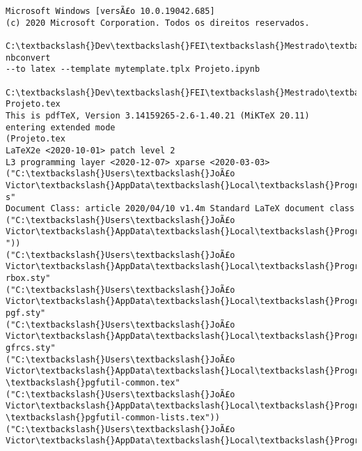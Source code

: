 \documentclass[11pt]{article}
\begin{document}
    \begin{Verbatim}[commandchars=\\\{\}]
Microsoft Windows [versÃ£o 10.0.19042.685]
(c) 2020 Microsoft Corporation. Todos os direitos reservados.

C:\textbackslash{}Dev\textbackslash{}FEI\textbackslash{}Mestrado\textbackslash{}3\_Periodo\textbackslash{}PEL301\_Biopotenciais\textbackslash{}Projeto>ipython nbconvert
--to latex --template mytemplate.tplx Projeto.ipynb

C:\textbackslash{}Dev\textbackslash{}FEI\textbackslash{}Mestrado\textbackslash{}3\_Periodo\textbackslash{}PEL301\_Biopotenciais\textbackslash{}Projeto>pdflatex Projeto.tex
This is pdfTeX, Version 3.14159265-2.6-1.40.21 (MiKTeX 20.11)
entering extended mode
(Projeto.tex
LaTeX2e <2020-10-01> patch level 2
L3 programming layer <2020-12-07> xparse <2020-03-03>
("C:\textbackslash{}Users\textbackslash{}JoÃ£o Victor\textbackslash{}AppData\textbackslash{}Local\textbackslash{}Programs\textbackslash{}MiKTeX\textbackslash{}tex/latex/base\textbackslash{}article.cl
s"
Document Class: article 2020/04/10 v1.4m Standard LaTeX document class
("C:\textbackslash{}Users\textbackslash{}JoÃ£o Victor\textbackslash{}AppData\textbackslash{}Local\textbackslash{}Programs\textbackslash{}MiKTeX\textbackslash{}tex/latex/base\textbackslash{}size11.clo
"))
("C:\textbackslash{}Users\textbackslash{}JoÃ£o Victor\textbackslash{}AppData\textbackslash{}Local\textbackslash{}Programs\textbackslash{}MiKTeX\textbackslash{}tex/latex/tcolorbox\textbackslash{}tcolo
rbox.sty"
("C:\textbackslash{}Users\textbackslash{}JoÃ£o Victor\textbackslash{}AppData\textbackslash{}Local\textbackslash{}Programs\textbackslash{}MiKTeX\textbackslash{}tex/latex/pgf/basiclayer\textbackslash{}
pgf.sty"
("C:\textbackslash{}Users\textbackslash{}JoÃ£o Victor\textbackslash{}AppData\textbackslash{}Local\textbackslash{}Programs\textbackslash{}MiKTeX\textbackslash{}tex/latex/pgf/utilities\textbackslash{}p
gfrcs.sty"
("C:\textbackslash{}Users\textbackslash{}JoÃ£o Victor\textbackslash{}AppData\textbackslash{}Local\textbackslash{}Programs\textbackslash{}MiKTeX\textbackslash{}tex/generic/pgf/utilities
\textbackslash{}pgfutil-common.tex"
("C:\textbackslash{}Users\textbackslash{}JoÃ£o Victor\textbackslash{}AppData\textbackslash{}Local\textbackslash{}Programs\textbackslash{}MiKTeX\textbackslash{}tex/generic/pgf/utilities
\textbackslash{}pgfutil-common-lists.tex"))
("C:\textbackslash{}Users\textbackslash{}JoÃ£o Victor\textbackslash{}AppData\textbackslash{}Local\textbackslash{}Programs\textbackslash{}MiKTeX\textbackslash{}tex/generic/pgf/utilities

\end{Verbatim}
\end{document}
